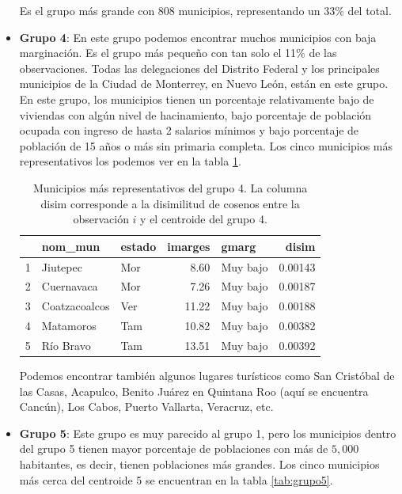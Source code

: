 \begin{itemize}
Es el grupo más grande con 808 municipios, representando un 33\% del total.

\item \textbf{Grupo 4}: En este grupo podemos encontrar muchos municipios con baja marginación. Es el grupo más pequeño con tan solo el 11\% de las observaciones. Todas las delegaciones del Distrito Federal y los principales municipios de la Ciudad de Monterrey, en Nuevo León, están en este grupo. En este grupo, los municipios tienen un porcentaje relativamente bajo de viviendas con algún nivel de hacinamiento, bajo porcentaje de población ocupada con ingreso de hasta 2 salarios mínimos y bajo porcentaje de población de 15 años o más sin primaria completa. Los cinco municipios más representativos los podemos ver en la tabla  \ref{tab:grupo4}.


\begin{table}[!ht]
\centering
\begin{tabular}{rllrlr}
  \hline
 & nom\_mun & estado & imarges & gmarg & disim \\ 
  \hline
1 & Jiutepec & Mor & 8.60 & Muy bajo & 0.00143 \\ 
  2 & Cuernavaca & Mor & 7.26 & Muy bajo & 0.00187 \\ 
  3 & Coatzacoalcos & Ver & 11.22 & Muy bajo & 0.00188 \\ 
  4 & Matamoros & Tam & 10.82 & Muy bajo & 0.00382 \\ 
  5 & Río Bravo & Tam & 13.51 & Muy bajo & 0.00392 \\ 
   \hline
\end{tabular}
\caption{Municipios más representativos del grupo 4. La columna disim corresponde a la disimilitud de cosenos entre la observación $i$ y el centroide del grupo 4. \label{tab:grupo4}}
\end{table}

Podemos encontrar también algunos lugares turísticos como San Cristóbal de las Casas, Acapulco, Benito Juárez en Quintana Roo (aquí se encuentra Cancún), Los Cabos, Puerto Vallarta, Veracruz, etc.

\item \textbf{Grupo 5}: Este grupo es muy parecido al grupo 1, pero los municipios dentro del grupo 5 tienen mayor porcentaje de poblaciones con más de $5,000$ habitantes, es decir, tienen poblaciones más grandes. Los cinco municipios más cerca del centroide 5 se encuentran en la tabla \ref{tab:grupo5}.


\end{itemize}
